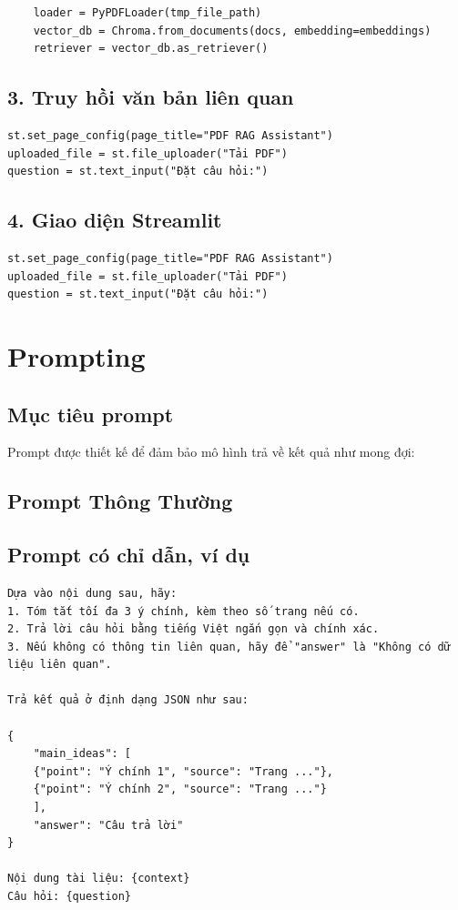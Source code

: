 \documentclass[11pt]{article}
\begin{document}
\begin{verbatim}
	loader = PyPDFLoader(tmp_file_path)
	vector_db = Chroma.from_documents(docs, embedding=embeddings)
	retriever = vector_db.as_retriever()
\end{verbatim}

\subsection*{3. Truy hồi văn bản liên quan}
\begin{verbatim}
st.set_page_config(page_title="PDF RAG Assistant")
uploaded_file = st.file_uploader("Tải PDF")
question = st.text_input("Đặt câu hỏi:")
\end{verbatim}

\subsection*{4. Giao diện Streamlit}

\begin{verbatim}
st.set_page_config(page_title="PDF RAG Assistant")
uploaded_file = st.file_uploader("Tải PDF")
question = st.text_input("Đặt câu hỏi:")
\end{verbatim}

\section{Prompting}

\subsection*{Mục tiêu prompt}
Prompt được thiết kế để đảm bảo mô hình trả về kết quả như mong đợi:

\subsection*{Prompt Thông Thường}

\subsection*{Prompt có chỉ dẫn, ví dụ}
\begin{verbatim}
Dựa vào nội dung sau, hãy:
1. Tóm tắt tối đa 3 ý chính, kèm theo số trang nếu có.
2. Trả lời câu hỏi bằng tiếng Việt ngắn gọn và chính xác.
3. Nếu không có thông tin liên quan, hãy để "answer" là "Không có dữ liệu liên quan".

Trả kết quả ở định dạng JSON như sau:

{
    "main_ideas": [
    {"point": "Ý chính 1", "source": "Trang ..."},
    {"point": "Ý chính 2", "source": "Trang ..."}
    ],
    "answer": "Câu trả lời"
}

Nội dung tài liệu: {context}
Câu hỏi: {question}
\end{verbatim}
\end{document}
